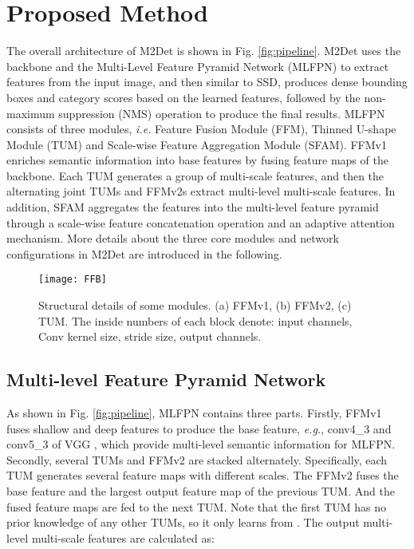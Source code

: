 \documentclass[letterpaper]{article} \usepackage{aaai18}  \usepackage{times}  \usepackage{helvet}  \usepackage{courier}  \usepackage{url}  \usepackage{graphicx}
\begin{document}
\section{Proposed Method}
The overall architecture of M2Det is shown in Fig. \ref{fig:pipeline}. M2Det uses the backbone and the Multi-Level Feature Pyramid Network (MLFPN) to extract  features from the input image, and then similar to SSD, produces dense bounding boxes and category scores based on the learned features, followed by the non-maximum suppression (NMS) operation to produce the final results. MLFPN consists of three modules, \textit{i.e.} Feature Fusion Module (FFM), Thinned U-shape Module (TUM) and Scale-wise Feature Aggregation Module (SFAM). FFMv1 enriches semantic information into base features by fusing feature maps of the backbone. Each TUM generates a group of multi-scale features, and then the alternating joint TUMs and FFMv2s extract multi-level multi-scale features. In addition, SFAM aggregates the features into the multi-level feature pyramid through a scale-wise feature concatenation operation and an adaptive attention mechanism. More details about the three core modules and network configurations in M2Det are introduced in the following.

\begin{figure}[!t]
	\centering
	\texttt{[image: FFB]}
	\caption{Structural details of some modules. (a) FFMv1, (b) FFMv2, (c) TUM. The inside numbers of each block denote: input channels, Conv kernel size, stride size, output channels.}
	\label{fig:ffb}
\end{figure}

\subsection{Multi-level Feature Pyramid Network}
As shown in Fig. \ref{fig:pipeline}, MLFPN contains three parts. Firstly, FFMv1 fuses shallow and deep features to produce the base feature, \textit{e.g.}, conv4\_3 and conv5\_3 of VGG \cite{SimonyanZ14a}, which provide multi-level semantic information for MLFPN. Secondly, several TUMs and FFMv2 are stacked alternately. Specifically, each TUM generates several feature maps with different scales. The FFMv2 fuses the base feature and the largest output feature map of the previous TUM. And the fused feature maps are fed to the next TUM. Note that the first TUM has no prior knowledge of any other TUMs, so it only learns from . The output multi-level multi-scale features are calculated as:
\end{document}
